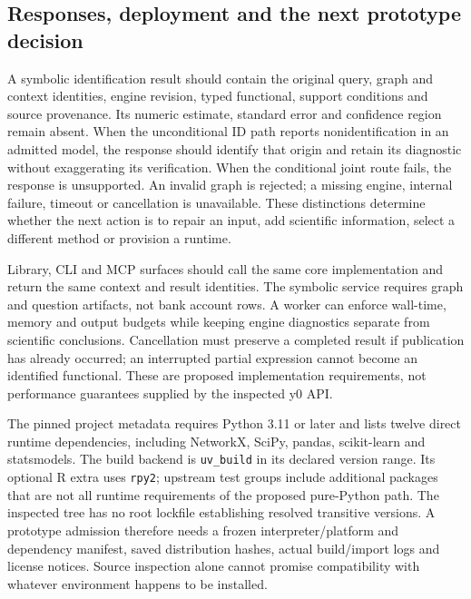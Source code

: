 \hypertarget{responses-deployment-and-the-next-prototype-decision}{%
\subsection{Responses, deployment and the next prototype
decision}\label{responses-deployment-and-the-next-prototype-decision}}

A symbolic identification result should contain the original query,
graph and context identities, engine revision, typed functional, support
conditions and source provenance. Its numeric estimate, standard error
and confidence region remain absent. When the unconditional ID path
reports nonidentification in an admitted model, the response should
identify that origin and retain its diagnostic without exaggerating its
verification. When the conditional joint route fails, the response is
unsupported. An invalid graph is rejected; a missing engine, internal
failure, timeout or cancellation is unavailable. These distinctions
determine whether the next action is to repair an input, add scientific
information, select a different method or provision a runtime.

Library, CLI and MCP surfaces should call the same core implementation
and return the same context and result identities. The symbolic service
requires graph and question artifacts, not bank account rows. A worker
can enforce wall-time, memory and output budgets while keeping engine
diagnostics separate from scientific conclusions. Cancellation must
preserve a completed result if publication has already occurred; an
interrupted partial expression cannot become an identified functional.
These are proposed implementation requirements, not performance
guarantees supplied by the inspected y0 API.

The pinned project metadata requires Python 3.11 or later and lists
twelve direct runtime dependencies, including NetworkX, SciPy, pandas,
scikit-learn and statsmodels. The build backend is \texttt{uv\_build} in
its declared version range. Its optional R extra uses \texttt{rpy2};
upstream test groups include additional packages that are not all
runtime requirements of the proposed pure-Python path. The inspected
tree has no root lockfile establishing resolved transitive versions. A
prototype admission therefore needs a frozen interpreter/platform and
dependency manifest, saved distribution hashes, actual build/import logs
and license notices. Source inspection alone cannot promise
compatibility with whatever environment happens to be installed.
\citep{exec13_y0_metadata,exec13_y0_tree}

